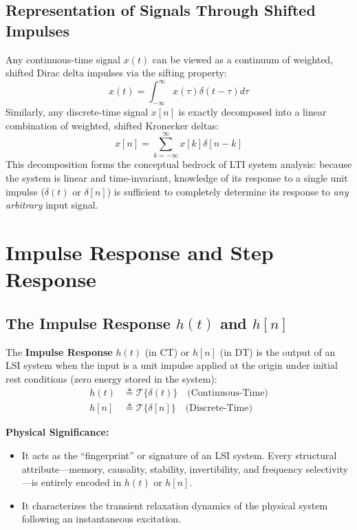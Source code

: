 \documentclass[12pt,a4paper]{article}
\begin{document}
\subsection{Representation of Signals Through Shifted Impulses}
Any continuous-time signal $x(t)$ can be viewed as a continuum of weighted, shifted Dirac delta impulses via the sifting property:
\begin{equation}
  x(t) = \int_{-\infty}^{\infty} x(\tau) \delta(t - \tau) d\tau
\end{equation}
Similarly, any discrete-time signal $x[n]$ is exactly decomposed into a linear combination of weighted, shifted Kronecker deltas:
\begin{equation}
  x[n] = \sum_{k=-\infty}^{\infty} x[k] \delta[n - k]
\end{equation}
This decomposition forms the conceptual bedrock of LTI system analysis: because the system is linear and time-invariant, knowledge of its response to a single unit impulse ($\delta(t)$ or $\delta[n]$) is sufficient to completely determine its response to \textit{any arbitrary} input signal.

\section{Impulse Response and Step Response}

\subsection{The Impulse Response $h(t)$ and $h[n]$}

\begin{tcolorbox}[defbox, title={\textbf{Definition: Impulse Response}}]
The \textbf{Impulse Response} $h(t)$ (in CT) or $h[n]$ (in DT) is the output of an LSI system when the input is a unit impulse applied at the origin under initial rest conditions (zero energy stored in the system):
\begin{align}
  h(t) &\triangleq \mathcal{T}\{\delta(t)\} \quad \text{(Continuous-Time)} \\
  h[n] &\triangleq \mathcal{T}\{\delta[n]\} \quad \text{(Discrete-Time)}
\end{align}
\end{tcolorbox}

\textbf{Physical Significance:}
\begin{itemize}[topsep=2pt, itemsep=2pt]
  \item It acts as the ``fingerprint'' or signature of an LSI system. Every structural attribute—memory, causality, stability, invertibility, and frequency selectivity—is entirely encoded in $h(t)$ or $h[n]$.
  \item It characterizes the transient relaxation dynamics of the physical system following an instantaneous excitation.
\end{itemize}
\end{document}
